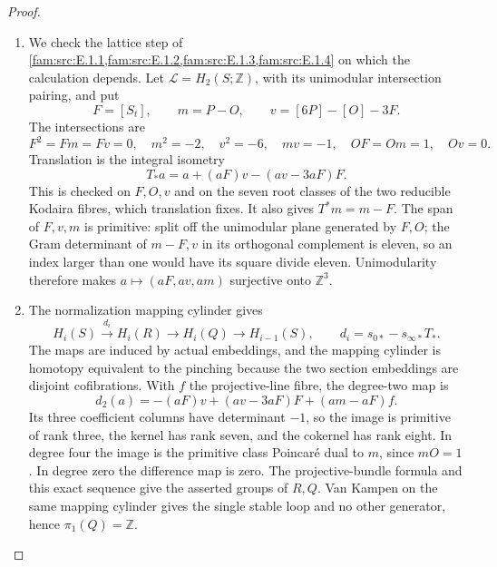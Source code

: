 \begin{proof}
\begin{enumerate}[label=\arabic*.,leftmargin=*]
\item We check the lattice step of \cref{fam:src:E.1.1,fam:src:E.1.2,fam:src:E.1.3,fam:src:E.1.4} on which the calculation depends.
Let $\mathcal L=H_2(S;\mathbb Z)$, with its unimodular intersection
pairing, and put
\[
 F=[S_t],\qquad m=P-O,\qquad v=[6P]-[O]-3F.
\]
The intersections are
\[
 F^2=Fm=Fv=0,\quad m^2=-2,\quad v^2=-6,\quad mv=-1,
 \quad OF=Om=1,\quad Ov=0.
\]
Translation is the integral isometry
\[
 T_*a=a+(aF)v-(av-3aF)F.
\]
This is checked on $F,O,v$ and on the seven root classes of
the two reducible Kodaira fibres, which translation fixes.
It also gives $T^*m=m-F$. The span of $F,v,m$ is primitive:
split off the unimodular plane generated by $F,O$; the Gram
determinant of $m-F,v$ in its orthogonal complement is eleven,
so an index larger than one would have its square divide eleven.
Unimodularity therefore makes
$a\mapsto(aF,av,am)$ surjective onto $\mathbb Z^3$.

\item The normalization mapping cylinder gives
\[
 H_i(S)\xrightarrow{d_i}H_i(R)\longrightarrow H_i(Q)
 \longrightarrow H_{i-1}(S),\qquad
 d_i=s_{0*}-s_{\infty*}T_*.
\]
The maps are induced by actual embeddings, and the mapping
cylinder is homotopy equivalent to the pinching because the
two section embeddings are disjoint cofibrations. With $f$ the
projective-line fibre, the degree-two map is
\[
 d_2(a)=-(aF)v+(av-3aF)F+(am-aF)f.
\]
Its three coefficient columns have determinant $-1$, so the
image is primitive of rank three, the kernel has rank seven,
and the cokernel has rank eight. In degree four the image is
the primitive class Poincar\'e dual to $m$, since $mO=1$.
In degree zero the difference map is zero. The projective-bundle
formula and this exact sequence give the asserted groups of
$R,Q$. Van Kampen on the same mapping cylinder gives the
single stable loop and no other generator, hence
$\pi_1(Q)=\mathbb Z$.


\end{enumerate}
\end{proof}
